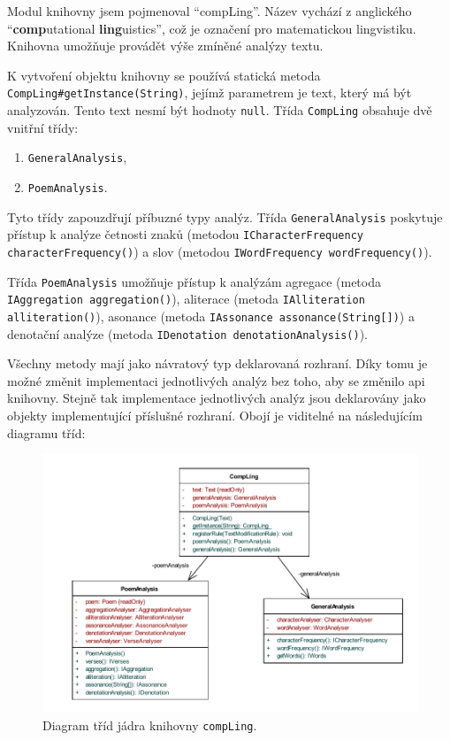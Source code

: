 \documentclass[dp.tex]{subfiles}
\begin{document}
Modul knihovny jsem pojmenoval \enquote{compLing}. Název vychází z anglického \enquote{\textbf{comp}utational \textbf{ling}uistics}, což je označení pro matematickou lingvistiku. Knihovna umožňuje provádět výše zmíněné analýzy textu. 

\sloppy
K vytvoření objektu knihovny se používá statická metoda \texttt{ CompLing\#getInstance(String)}, jejímž parametrem je text, který má být analyzován. Tento text nesmí být hodnoty \texttt{null}. Třída \texttt{CompLing} obsahuje dvě vnitřní třídy:
\begin{enumerate}
	\item \texttt{GeneralAnalysis},
	\item \texttt{PoemAnalysis}.
\end{enumerate}

Tyto třídy zapouzdřují příbuzné typy analýz. Třída \texttt{GeneralAnalysis} poskytuje přístup k analýze četnosti znaků (metodou \texttt{ICharacterFrequency characterFrequency()}) a slov (metodou \texttt{IWordFrequency wordFrequency()}). 

\sloppy
Třída \texttt{PoemAnalysis} umožňuje přístup k analýzám agregace (metoda \texttt{IAggregation aggregation()}), aliterace (metoda \texttt{IAlliteration alliteration()}), asonance (metoda \texttt{IAssonance assonance(String[])}) a denotační analýze (metoda \texttt{IDenotation denotationAnalysis()}).

Všechny metody mají jako návratový typ deklarovaná rozhraní. Díky tomu je možné změnit implementaci jednotlivých analýz bez toho, aby se změnilo \acrshort{api} knihovny. Stejně tak implementace jednotlivých analýz jsou deklarovány jako objekty implementující příslušné rozhraní. Obojí je viditelné na následujícím diagramu tříd:

\begin{figure}[h!]
	\centering
	\includegraphics[max width=\textwidth,keepaspectratio=true]{imgs-60-aplikace/compLing-class-diagram.pdf}
	\caption{Diagram tříd jádra knihovny \texttt{compLing}.}
	\label{fig:compling-core-class}
\end{figure}
\end{document}
